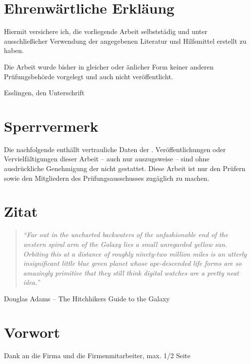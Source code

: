 \chapter*{Ehrenwärtliche Erkläung}

Hiermit versichere ich, die vorliegende Arbeit selbststädig und unter ausschließicher Verwendung der angegebenen Literatur und Hilfsmittel erstellt zu haben.

Die Arbeit wurde bisher in gleicher oder änlicher Form keiner anderen Prüfungsbehörde vorgelegt und auch nicht veröffentlicht.



\hrulefill

Esslingen, den \workDate \hspace*{\fill} Unterschrift


\newpage
%
\chapter*{Sperrvermerk} %

Die nachfolgende \workTyp enthällt vertrauliche Daten der \workFirma.
Veröffentlichungen oder Vervielfältigungen dieser Arbeit -- auch nur auszugsweise -- sind ohne ausdrückliche Genehmigung der \workFirma nicht gestattet.
Diese Arbeit ist nur den Prüfern sowie den Mitgliedern des Prüfungsausschusses zugäglich zu machen.
\newpage
%
\chapter*{Zitat} %
\begin{center}
\begin{minipage}{12cm}
\begin{quotation}
\textit{\enquote{Far out in the uncharted backwaters of the unfashionable
end of the western spiral arm of the Galaxy lies a small unregarded
yellow sun. Orbiting this at a distance of roughly ninety-two
million miles is an utterly insignificant little blue green planet
whose ape-descended life forms are so amazingly primitive that they
still think digital watches are a pretty neat idea.}}
\end{quotation}
\hfill \textsf Douglas Adams -- The Hitchhikers Guide to the Galaxy
\end{minipage}
\end{center}
\newpage{}
\chapter*{Vorwort} %

Dank an die Firma und die Firmenmitarbeiter, max. 1/2 Seite

\newpage
